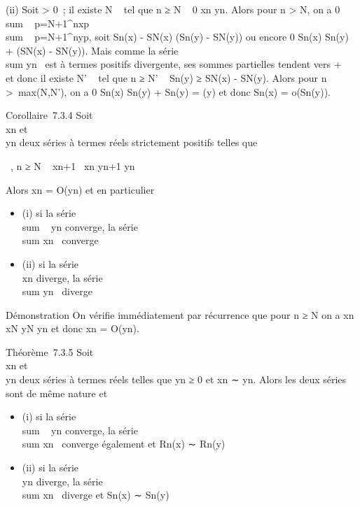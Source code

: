 (ii) Soit \epsilon \textgreater{} 0~; il existe N \in {}~ tel que n ≥ N \rigtharrow~ 0 \leq
xn \leq \epsilon {} yn. Alors pour n
\textgreater{} N, on a 0
\leq\\sum ~
p=N+1^nxp \leq \epsilon {}
 \\sum ~
p=N+1^nyp, soit Sn(x) -
SN(x) \leq \epsilon {} (Sn(y) -
SN(y)) ou encore 0 \leq Sn(x) \leq \epsilon
{} Sn(y) + (SN(x) - \epsilon
{} SN(y)). Mais comme la série
\\sum  yn~ est
à termes positifs divergente, ses sommes partielles tendent vers + \infty~ et
donc il existe N' \in {}~ tel que n ≥ N' \rigtharrow~ \epsilon {}
Sn(y) ≥ SN(x) - \epsilon {}
SN(y). Alors pour n \textgreater{}\
max(N,N'), on a 0 \leq Sn(x) \leq \epsilon {}
Sn(y) + \epsilon \over 2 Sn(y) =
\epsilonSn(y) et donc Sn(x) = o(Sn(y)).

Corollaire~7.3.4 Soit \\\sum
 xn et \\\sum
 yn deux séries à termes réels strictement positifs telles
que

\existsN \in {}~, n ≥ N \rigtharrow~ xn+1~
\over xn \leq yn+1
\over yn

Alors xn = O(yn) et en particulier

\begin{itemize}
\itemsep1pt\parskip0pt
\item
  (i) si la série \\sum ~
  yn converge, la série
  \\sum  xn~
  converge
\item
  (ii) si la série \\\sum
   xn diverge, la série
  \\sum  yn~
  diverge
\end{itemize}

Démonstration On vérifie immédiatement par récurrence que pour n ≥ N on
a xn \leq xN \over yN
yn et donc xn = O(yn).

Théorème~7.3.5 Soit \\\sum
 xn et \\\sum
 yn deux séries à termes réels telles que yn ≥ 0
et xn ∼ yn. Alors les deux séries sont de même
nature et

\begin{itemize}
\itemsep1pt\parskip0pt
\item
  (i) si la série \\sum ~
  yn converge, la série
  \\sum  xn~
  converge également et Rn(x) ∼ Rn(y)
\item
  (ii) si la série \\\sum
   yn diverge, la série
  \\sum  xn~
  diverge et Sn(x) ∼ Sn(y)
\end{itemize}

